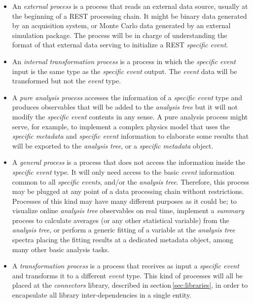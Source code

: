 \begin{itemize}
\item An \emph{external process} is a process that reads an external data source, usually at the beginning of a REST processing chain. It might be binary data generated by an acquisition system, or Monte Carlo data generated by an external simulation package. The process will be in charge of understanding the format of that external data serving to initialize a REST \emph{specific event}.

\item An \emph{internal transformation process} is a process in which the \emph{specific event} input is the same type as the \emph{specific event} output. The \emph{event} data will be transformed but not the \emph{event} type.

\item A \emph{pure analysis process} accesses the information of a \emph{specific event} type and produces observables that will be added to the \emph{analysis tree} but it will not modify the \emph{specific event} contents in any sense. A pure analysis process might serve, for example, to implement a complex physics model that uses the \emph{specific metadata} and \emph{specific event} information to elaborate some results that will be exported to the \emph{analysis tree}, or a \emph{specific metadata} object.

\item A \emph{general process} is a process that does not access the information inside the \emph{specific event} type. It will only need access to the basic \emph{event} information common to all \emph{specific events}, and/or the \emph{analysis tree}. Therefore, this process may be plugged at any point of a data processing chain without restrictions. Processes of this kind may have many different purposes as it could be; to visualize online \emph{analysis tree} observables on real time, implement a \emph{summary} process to calculate averages (or any other statistical variable) from the \emph{analysis tree}, or perform a generic fitting of a variable at the \emph{analysis tree} spectra placing the fitting results at a dedicated metadata object, among many other basic analysis tasks.

\item A \emph{transformation process} is a process that receives as input a \emph{specific event} and transforms it to a different \emph{event} type. This kind of processes will all be placed at the \emph{connectors} library, described in section\,\ref{sec:libraries}, in order to encapsulate all library inter-dependencies in a single entity. 
\end{itemize}

